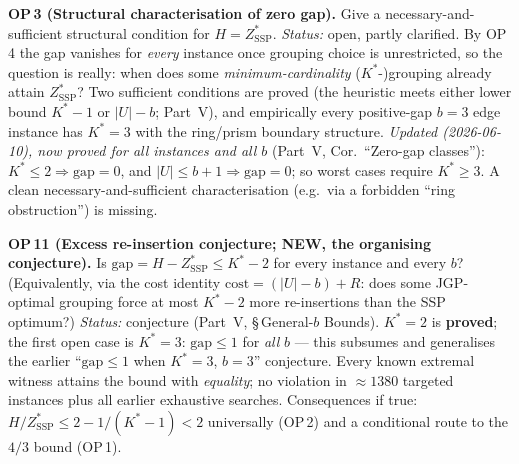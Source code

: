 \documentclass[11pt,a4paper]{article}
\newcommand{\ZSSP}{Z_{\mathrm{SSP}}^{*}}
\newcommand{\Kstar}{K^{*}}
\begin{document}
\begin{op}
\textbf{OP\,3 (Structural characterisation of zero gap).} Give a necessary-and-sufficient
structural condition for $H=\ZSSP$. \emph{Status:} open, partly clarified. By OP\,4 the gap
vanishes for \emph{every} instance once grouping choice is unrestricted, so the question is
really: when does some \emph{minimum-cardinality} ($\Kstar$-)grouping already attain
$\ZSSP$? Two sufficient conditions are proved (the heuristic meets either lower bound
$\Kstar-1$ or $|U|-b$; Part~V), and empirically every positive-gap $b=3$ edge instance has
$\Kstar=3$ with the ring/prism boundary structure.
\emph{Updated (2026-06-10), now proved for all instances and all $b$} (Part~V,
Cor.\ ``Zero-gap classes''): $\Kstar\le2\Rightarrow\mathrm{gap}=0$, and
$|U|\le b+1\Rightarrow\mathrm{gap}=0$; so worst cases require $\Kstar\ge3$.
A clean necessary-and-sufficient
characterisation (e.g.\ via a forbidden ``ring obstruction'') is missing.
\end{op}
\begin{op}
\textbf{OP\,11 (Excess re-insertion conjecture; NEW, the organising conjecture).}
Is $\mathrm{gap}=H-\ZSSP\le\Kstar-2$ for every instance and every $b$?
(Equivalently, via the cost identity $\mathrm{cost}=(|U|-b)+R$: does some
JGP-optimal grouping force at most $\Kstar-2$ more re-insertions than the SSP
optimum?) \emph{Status:} conjecture (Part~V, \S\,General-$b$ Bounds).
$\Kstar=2$ is \textbf{proved}; the first open case is $\Kstar=3$:
$\mathrm{gap}\le1$ for \emph{all} $b$ --- this subsumes and generalises the
earlier ``$\mathrm{gap}\le1$ when $\Kstar=3$, $b=3$'' conjecture. Every known
extremal witness attains the bound with \emph{equality}; no violation in
$\approx1380$ targeted instances plus all earlier exhaustive searches.
Consequences if true: $H/\ZSSP\le2-1/(\Kstar-1)<2$ universally (OP\,2) and a
conditional route to the $4/3$ bound (OP\,1).
\end{op}
\end{document}
